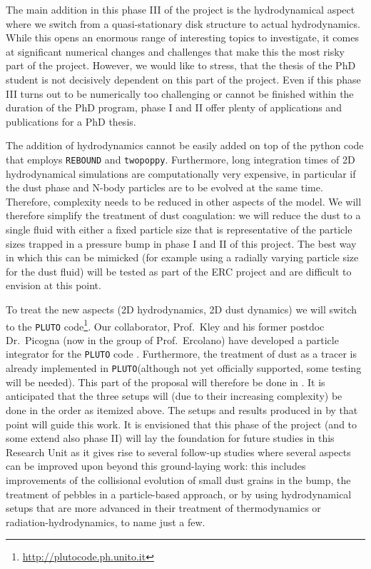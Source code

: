 \documentclass[10pt,fleqn,twoside]{article}
\newcommand{\twopoppy}{\texttt{twopoppy}\xspace}
\newcommand{\rebound}{\texttt{REBOUND}\xspace}
\newcommand{\pluto}{\texttt{PLUTO}\xspace}
\begin{document}
The main addition in this phase III of the project is the
hydrodynamical aspect where we switch from a quasi-stationary disk
structure to actual hydrodynamics. While this opens an enormous range
of interesting topics to investigate, it comes at significant
numerical changes and challenges that make this the most risky part of
the project. However, we would like to stress, that the thesis of the
PhD student is not decisively dependent on this part of the project.
Even if this phase III turns out to be numerically too challenging or
cannot be finished within the duration of the PhD program, phase I and
II offer plenty of applications and publications for a PhD thesis.

The addition of hydrodynamics cannot be easily added on top of the
python code that employs \rebound and \twopoppy. Furthermore, long
integration times of 2D hydrodynamical simulations are computationally
very expensive, in particular if the dust phase and N-body particles
are to be evolved at the same time. Therefore, complexity needs to be
reduced in other aspects of the model. We will therefore simplify the
treatment of dust coagulation: we will reduce the dust to a single
fluid with either a fixed particle size that is representative of the
particle sizes trapped in a pressure bump in phase I and II of this
project. The best way in which this can be mimicked (for example using
a radially varying particle size for the dust fluid) will be tested as
part of the ERC project and are difficult to envision at this point.

To treat the new aspects (2D hydrodynamics, 2D dust dynamics) we will
switch to the \pluto
code\footnote{\url{http://plutocode.ph.unito.it}}. Our collaborator,
Prof.~Kley and his former postdoc Dr.\ Picogna (now in the group of
Prof.~Ercolano) have developed a particle integrator for the \pluto
code \citep[see][]{2015A&A...584A.110P}. Furthermore, the treatment of
dust as a tracer is already implemented in \pluto (although not yet
officially supported, some testing will be needed). This part of the
proposal will therefore be done in . It is
anticipated that the three setups will (due to their increasing
complexity) be done in the order as itemized above. The setups and
results produced in  by that point will
guide this work. It is envisioned that this phase of the project (and
to some extend also phase II) will lay the foundation for future
studies in this Research Unit as it gives rise to several follow-up
studies where several aspects can be improved upon beyond this
ground-laying work: this includes improvements of the collisional
evolution of small dust grains in the bump, the treatment of pebbles
in a particle-based approach, or by using hydrodynamical setups that
are more advanced in their treatment of thermodynamics or
radiation-hydrodynamics, to name just a few.
\end{document}
